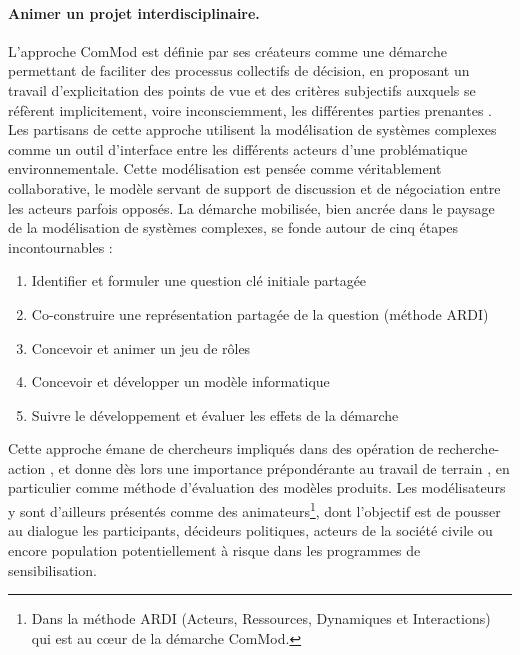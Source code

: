 \paragraph{Animer un projet interdisciplinaire.}

L'approche ComMod est définie par ses créateurs comme \og une démarche permettant de faciliter des processus collectifs de décision, en proposant un travail d’explicitation des points de vue et des critères subjectifs auxquels se réfèrent implicitement, voire inconsciemment, les différentes parties prenantes\fg{} \autocite[167]{commod_modelisation_2005}.
Les partisans de cette approche utilisent la modélisation de systèmes complexes comme un outil d'interface entre les différents acteurs d'une problématique environnementale.
Cette modélisation est pensée comme véritablement collaborative, le modèle servant de support de discussion et de négociation entre les acteurs parfois opposés.
La démarche mobilisée, bien ancrée dans le paysage de la modélisation de systèmes complexes, se fonde autour de \og cinq étapes incontournables\fg{} \autocite[41-132]{etienne_modelisation_2015} :
\begin{enumerate}
	\item Identifier et formuler une question clé initiale partagée
	\item Co-construire une représentation partagée de la question (méthode \og ARDI\fg{})
	\item Concevoir et animer un jeu de rôles
	\item Concevoir et développer un modèle informatique
	\item Suivre le développement et évaluer les effets de la démarche
\end{enumerate}

Cette approche émane de chercheurs impliqués dans des opération de \og recherche-action\fg{} \autocite[165]{commod_modelisation_2005}, et donne dès lors une importance prépondérante au travail de terrain \autocite[3.3]{barreteau_our_2003}, en particulier comme méthode d'évaluation des modèles produits.
Les modélisateurs y sont d'ailleurs présentés comme des \og animateurs\fg{}\footnote{
	Dans la méthode \og ARDI \fg{} (Acteurs, Ressources, Dynamiques et Interactions) \autocite{etienne_co-construction_2009} qui est au cœur de la démarche ComMod.
}, dont l'objectif est de pousser au dialogue les \og participants\fg{}, décideurs politiques, acteurs de la société civile ou encore population potentiellement à risque dans les programmes de sensibilisation.


